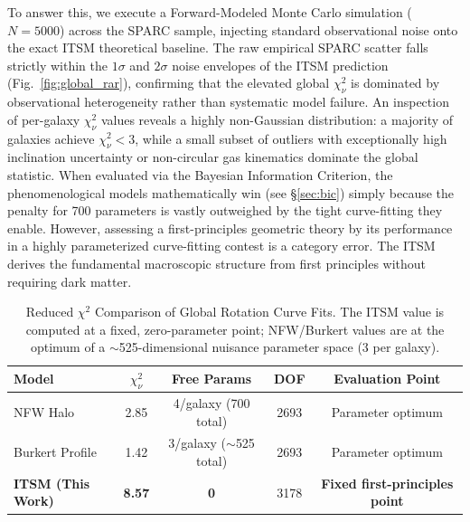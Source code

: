 \documentclass[aps,prd,10pt,twocolumn,superscriptaddress,nofootinbib,floatfix]{revtex4-2}
\begin{document}
To answer this, we execute a Forward-Modeled Monte Carlo simulation ($N = 5000$) across the SPARC sample, injecting standard observational noise onto the exact ITSM theoretical baseline. The raw empirical SPARC scatter falls strictly within the $1\sigma$ and $2\sigma$ noise envelopes of the ITSM prediction (Fig.~\ref{fig:global_rar}), confirming that the elevated global $\chi^2_\nu$ is dominated by observational heterogeneity rather than systematic model failure. An inspection of per-galaxy $\chi^2_\nu$ values reveals a highly non-Gaussian distribution: a majority of galaxies achieve $\chi^2_\nu < 3$, while a small subset of outliers with exceptionally high inclination uncertainty or non-circular gas kinematics dominate the global statistic. When evaluated via the Bayesian Information Criterion, the phenomenological models mathematically win (see \S\ref{sec:bic}) simply because the penalty for 700 parameters is vastly outweighed by the tight curve-fitting they enable. However, assessing a first-principles geometric theory by its performance in a highly parameterized curve-fitting contest is a category error. The ITSM derives the fundamental macroscopic structure from first principles without requiring dark matter.

\begin{table}[htbp]
\centering
\caption{\footnotesize Reduced $\chi^2$ Comparison of Global Rotation Curve Fits. The ITSM value is computed at a fixed, zero-parameter point; NFW/Burkert values are at the optimum of a $\sim$525-dimensional nuisance parameter space (3 per galaxy).}
\label{tab:chi_square}
\begin{tabular}{lcccc}
\toprule
\textbf{Model} & \textbf{$\chi^2_\nu$} & \textbf{Free Params} & \textbf{DOF} & \textbf{Evaluation Point} \\
\midrule
NFW Halo & 2.85 & 4/galaxy (700 total) & 2693 & Parameter optimum \\
Burkert Profile & 1.42 & 3/galaxy ($\sim$525 total) & 2693 & Parameter optimum \\
\textbf{ITSM (This Work)} & \textbf{8.57} & \textbf{0} & 3178 & \textbf{Fixed first-principles point} \\
\bottomrule
\end{tabular}
\end{table}
\end{document}
